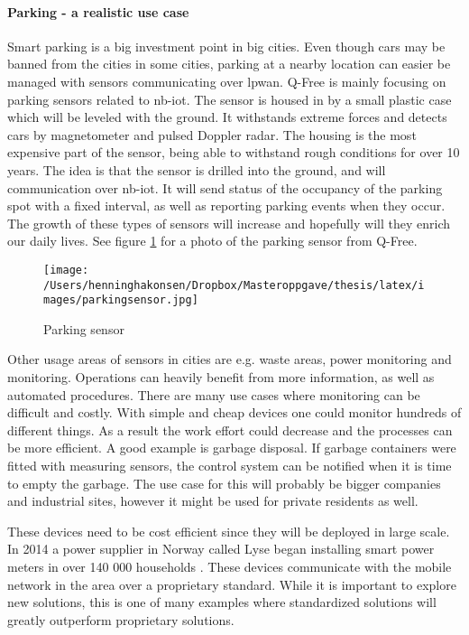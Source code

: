 \documentclass[USenglish]{ifimaster}  %
\begin{document}
\paragraph{Parking - a realistic use case} \label{paragraph:sensoroutline}
Smart parking is a big investment point in big cities. Even though cars may be banned from the cities in some cities, parking at a nearby location can easier be managed with sensors communicating over \acrshort{lpwan}. Q-Free is mainly focusing on parking sensors related to \acrshort{nb-iot}. The sensor is housed in by a small plastic case which will be leveled with the ground. It withstands extreme forces and detects cars by magnetometer and pulsed Doppler radar. The housing is the most expensive part of the sensor, being able to withstand rough conditions for over 10 years. The idea is that the sensor is drilled into the ground, and will communication over \acrshort{nb-iot}. It will send status of the occupancy of the parking spot with a fixed interval, as well as reporting parking events when they occur. The growth of these types of sensors will increase and hopefully will they enrich our daily lives. See figure \ref{pic:parkingsensor} for a photo of the parking sensor from Q-Free.

\begin{figure}[ht]
  \centering\texttt{[image: /Users/henninghakonsen/Dropbox/Masteroppgave/thesis/latex/images/parkingsensor.jpg]}
  \caption{Parking sensor  \cite{person:ola}}
  \label{pic:parkingsensor}
\end{figure}

Other usage areas of sensors in cities are e.g. waste areas, power monitoring and  monitoring. Operations can heavily benefit from more information, as well as automated procedures. There are many use cases where monitoring can be difficult and costly. With simple and cheap devices one could monitor hundreds of different things. As a result the work effort could decrease and the processes can be more efficient. A good example is garbage disposal. If garbage containers were fitted with measuring sensors, the control system can be notified when it is time to empty the garbage. The use case for this will probably be bigger companies and industrial sites, however it might be used for private residents as well.

These devices need to be cost efficient since they will be deployed in large scale. In 2014 a power supplier in Norway called Lyse began installing smart power meters in over 140 000 households \cite{online:lyseAMS}. These devices communicate with the mobile network in the area over a proprietary standard. While it is important to explore new solutions, this is one of many examples where standardized solutions will greatly outperform proprietary solutions.
\end{document}
